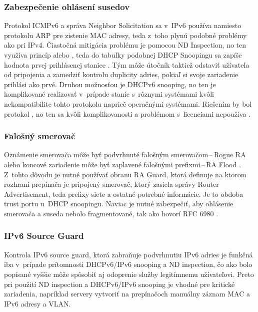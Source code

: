 \subsubsection{Zabezpečenie ohlásení susedov}
Protokol ICMPv6 a správa Neighbor Solicitation sa v~IPv6 používa namiesto protokolu ARP pre zistenie MAC adresy, teda z~toho plynú podobné problémy ako pri IPv4. Čiastočná mitigácia problému je pomocou ND Inspection, no ten využíva princíp  alebo , teda do tabuľky podobnej DHCP Snoopingu sa zapíše hodnota prvej prihlásenej stanice \cite{Gregr522015} \cite{Podermanski1222015}. Tým môže útočník taktiež odstaviť užívateľa od pripojenia a zamedziť kontrolu duplicity adries, pokiaľ si svoje zariadenie prihlási ako prvé. Druhou možnosťou je DHCPv6 snooping, no ten je komplikované realizovať v~prípade staníc s~rôznymi systémami kvôli nekompatibilite tohto protokolu naprieč operačnými systémami. Riešením by bol protokol , no ten sa kvôli komplikovanosti a problémom s~licenciami nepoužíva \cite{Alsadeh1252015}.   

\subsubsection{Falošný smerovač}
Oznámenie smerovača môže byť podvrhnuté falošným smerovačom\,--\,Rogue RA alebo koncové zariadenie môže byť zaplavené falošnými prefixmi\,--\,RA Flood \cite{Gregr522015} \cite{Podermanski1222015}. Z~tohto dôvodu je nutné používať obranu RA Guard, ktorá definuje na ktorom rozhraní prepínača je pripojený smerovač, ktorý zasiela správy Router Advertisement, teda prefixy siete a ostatné potrebné informácie. Je to obdoba trust portu u~DHCP snoopingu. Naviac je nutné zabezpečiť, aby ohlásenie smerovača a suseda nebolo fragmentované, tak ako hovorí RFC 6980 \cite{rfc6980YBLH6JtaHyFaxE8i}.

\subsubsection{IPv6 Source Guard}
Kontrola IPv6 source guard, ktorá zabraňuje podvrhnutiu IPv6 adries je funkčná iba v~prípade prítomnosti DHCPv6/IPv6 snooping a ND inspection, čo ako bolo popísané vyššie môže spôsobiť aj odoprenie služby legitímnemu užívateľovi. Preto pri použití ND inspection a DHCPv6/IPv6 snooping je vhodné pre kritické zariadenia, napríklad servery vytvoriť na prepínačoch manuálny záznam MAC a IPv6 adresy a VLAN.    

